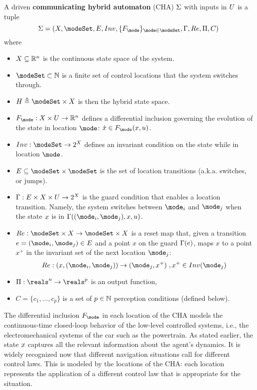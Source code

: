 \begin{defn}
	\label{def:CHA}
A driven \textbf{communicating hybrid automaton} (CHA) $\Sigma$ with inputs in $U$ 
is a tuple 
\[\Sys = (\stSet, \modeSet, E, Inv, \{F_\mode\}_{\mode \in \modeSet}, \guard, \reset, \funcOut, C)\]
where 
\begin{itemize}
	\item $X \subseteq \mathbb{R}^n$ is the continuous state space of the system.
	\item $\modeSet \subset \Ne$ is a finite set of control locations that the system switches through. 
	\item $\hsSet \triangleq \modeSet \times \stSet$ is then the hybrid state space.
	\item $F_\mode : \stSet \times \inpSet \rightarrow \Re^n$ defines a differential inclusion governing the evolution of the state in location $\mode$: $\dot{\stPt} \in F_\mode(\stPt,u)$. 
	\item $Inv : \modeSet \rightarrow 2^\stSet$ defines an invariant condition on the state while in location $\mode$.
	\item $E \subseteq \modeSet \times \modeSet$ is the set of location transitions (a.k.a. switches, or jumps).
	\item $\Gamma : E \times X \times U \rightarrow 2^X$ is the guard condition that enables a location transition. 
	Namely, the system switches between $\mode _i$ and $\mode _j$ when the state $x$ is in $\guard((\mode_i,\mode _j),x,u)$.
	\item $\reset : \modeSet \times \stSet \rightarrow \modeSet \times \stSet $ is a reset map that, given a transition $e = (\mode _i,\mode _j) \in E$ and a point $x$ on the guard $\Gamma(e)$, maps $x$ to a point $x^+$ in the invariant set of the next location $\mode_j$:
	\[\reset: (x,(\mode _i,\mode _j)) \rightarrow (\mode_j,x^+)\;, x^+ \in Inv(\mode_j)\] 
	\item $\funcOut: \reals^n \rightarrow \reals^p$ is an output function,
	\item $C = \{c_1,\ldots,c_p\}$ is a set of $p \in \mathbb{N}$ perception conditions (defined below).	
\end{itemize}
\end{defn}

The differential inclusion $F_\mode$ in each location of the CHA models the continuous-time closed-loop behavior of the low-level controlled systems, i.e., the electromechanical systems of the car such as the powertrain.
As stated earlier, the state $x$ captures all the relevant information about the agent's dynamics. 
It is widely recognized now that different navigation situations call for different control laws.
This is modeled by the locations of the CHA: each location represents the application of a different control law that is appropriate for the situation.


